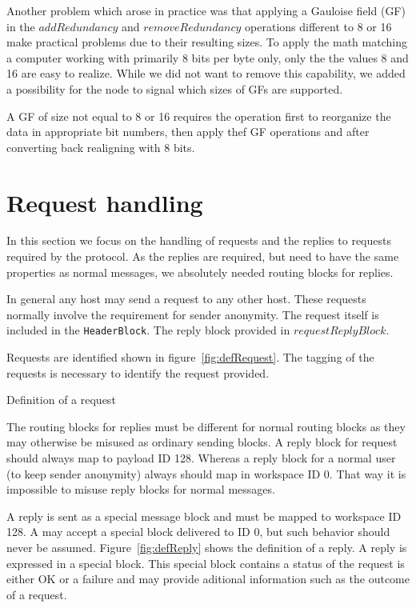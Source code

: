 Another problem which arose in practice was that applying a Gauloise field (GF) in the $addRedundancy$ and $removeRedundancy$ operations different to 8 or 16 make practical problems due to their resulting sizes. To apply the math matching a computer working with primarily 8 bits per byte only, only the the values 8 and 16 are easy to realize. While we did not want to remove this capability, we added a possibility for the node to signal which sizes of GFs are supported.

A GF of size not equal to 8 or 16 requires the operation first to reorganize the data in appropriate bit numbers, then apply thef GF operations and after converting back realigning with 8 bits.

\section{Request handling}
In this section we focus on the handling of requests and the replies to requests required by the protocol. As the replies are required, but need to have the same properties as normal messages, we absolutely needed routing blocks for replies.

In general any host may send a request to any other host. These requests normally involve the requirement for sender anonymity. The request itself is included in the \lstinline[columns=fixed,basicstyle=\normalsize]{HeaderBlock}. The reply block provided in $requestReplyBlock$.

Requests are identified shown in figure~\ref{fig:defRequest}. The tagging of the requests is necessary to identify the request provided.

\begin{lstfloat}[ht]
	
	\caption{Definition of a request}
	\label{fig:defRequest}
\end{lstfloat}

The routing blocks for replies must be different for normal routing blocks as they may otherwise be misused as ordinary sending blocks. A reply block for request should always map to payload ID 128. Whereas a reply block for a normal user (to keep sender anonymity) always should map in workspace ID 0. That way it is impossible to misuse reply blocks for normal messages.

A reply is sent as a special message block and must be mapped to workspace ID 128. A \VortexNode{} may accept a special block delivered to ID 0, but such behavior should never be assumed. Figure~\ref{fig:defReply} shows the definition of a reply. A reply is expressed in a special block. This special block contains a status of the request is either OK or a failure and may provide aditional information such as the outcome of a request.

